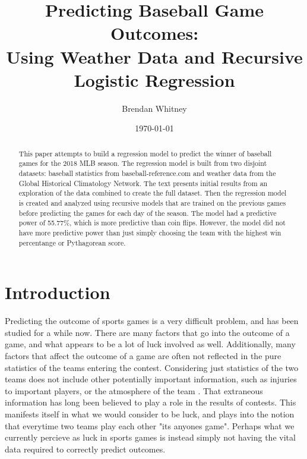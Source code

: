 \documentclass{article}
\begin{document}
\title{Predicting Baseball Game Outcomes:\\
Using Weather Data and Recursive Logistic Regression}
\author{Brendan Whitney}
\date{\today}
\maketitle

\begin{abstract}
    This paper attempts to build a regression model to predict the winner of 
    baseball games for the 2018 MLB season.
    The regression model is built from two disjoint datasets:
    baseball statistics from baseball-reference.com
    and weather data from the Global Historical Climatology Network.
    The text presents initial results from an exploration of the data combined 
    to create the full dataset.
    Then the regression model is created and analyzed using recursive models
    that are trained on the previous games before predicting the games for 
    each day of the season.
    The model had a predictive power of 55.77\%,
    which is more predictive than coin flips.
    However,
    the model did not have more predictive power than just simply choosing
    the team with the highest win percentange or Pythagorean score.
\end{abstract}

\section{Introduction}
Predicting the outcome of sports games is a very difficult problem,
and has been studied for a while now.
There are many factors that go into the outcome of a game,
and what appears to be a lot of luck involved as well.
Additionally,
many factors that affect the outcome of a game are often not reflected in the
pure statistics of the teams entering the contest.
Considering just statistics of the two teams does not include other potentially
important information,
such as injuries to important players,
or the atmosphere of the team \cite{Boulier}.
That extraneous information has long been believed to play a role in the
results of contests.
This manifests itself in what we would consider to be luck,
and plays into the notion that everytime two teams play each other "its
anyones game".
Perhaps what we currently percieve as luck in sports games is instead simply
not having the vital data required to correctly predict outcomes. \par
\end{document}
